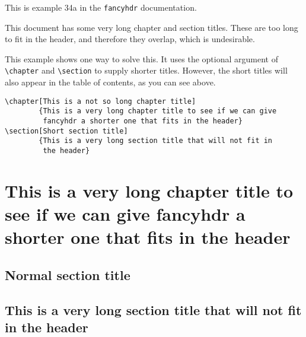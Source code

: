 \documentclass[oneside]{book}
\begin{document}
\thispagestyle{plain}
\tableofcontents

\bigskip

\noindent
\begin{boxedminipage}{\textwidth}
This is example 34a in the \texttt{fancyhdr} documentation.

This document has some very long chapter and section titles. These are too long to fit in the header, and therefore they overlap, which is undesirable.

This example shows one way to solve this.
It uses the optional argument of \verb|\chapter| and \verb|\section| to supply shorter titles. However, the short titles will also appear in the table of contents, as you can see above.

\begin{verbatim}
\chapter[This is a not so long chapter title]
        {This is a very long chapter title to see if we can give
         fancyhdr a shorter one that fits in the header}
\section[Short section title]
        {This is a very long section title that will not fit in
         the header}
\end{verbatim}
\end{boxedminipage}

\newpage
\pagestyle{fancy}
\chapter[This is a not so long chapter title]
        {This is a very long chapter title to see if we can give
         fancyhdr a shorter one that fits in the header}
\thispagestyle{fancy}

\kant[1-3]

\section{Normal section title}

\kant[4-5]

\section[Short section title]
        {This is a very long section title that will not fit in
         the header}

\kant[6-7]
\end{document}
